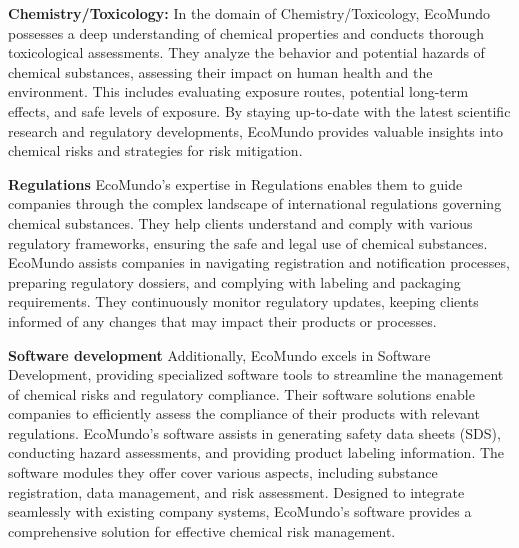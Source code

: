 \documentclass[a4paper,12pt,twoside]{report}
\begin{document}
\itemize[label=$\bullet$] 
\item \textbf{Chemistry/Toxicology:}
In the domain of Chemistry/Toxicology, EcoMundo possesses a deep understanding of chemical properties and conducts thorough toxicological assessments. They analyze the behavior and potential hazards of chemical substances, assessing their impact on human health and the environment. This includes evaluating exposure routes, potential long-term effects, and safe levels of exposure. By staying up-to-date with the latest scientific research and regulatory developments, EcoMundo provides valuable insights into chemical risks and strategies for risk mitigation.
\item \textbf{Regulations}
EcoMundo's expertise in Regulations enables them to guide companies through the complex landscape of international regulations governing chemical substances. They help clients understand and comply with various regulatory frameworks, ensuring the safe and legal use of chemical substances. EcoMundo assists companies in navigating registration and notification processes, preparing regulatory dossiers, and complying with labeling and packaging requirements. They continuously monitor regulatory updates, keeping clients informed of any changes that may impact their products or processes.
\item \textbf{Software development}
Additionally, EcoMundo excels in Software Development, providing specialized software tools to streamline the management of chemical risks and regulatory compliance. Their software solutions enable companies to efficiently assess the compliance of their products with relevant regulations. EcoMundo's software assists in generating safety data sheets (SDS), conducting hazard assessments, and providing product labeling information. The software modules they offer cover various aspects, including substance registration, data management, and risk assessment. Designed to integrate seamlessly with existing company systems, EcoMundo's software provides a comprehensive solution for effective chemical risk management.
\end{document}
